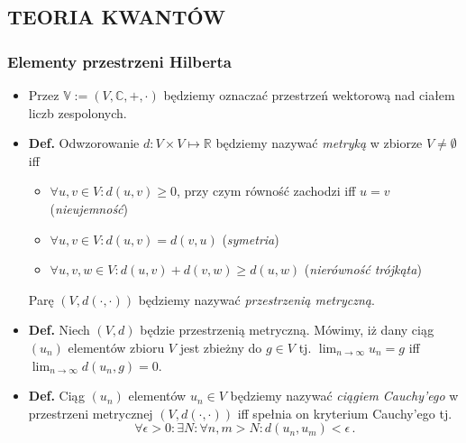 \documentclass{myclass}
\author{Bartosz Hanc}
\begin{document}
\subsection{TEORIA KWANTÓW}

\subsubsection{Elementy przestrzeni Hilberta}

\begin{itemize}

    \item Przez \(\mathbb{V} := (V,\mathbb{C},+,\cdot)\) będziemy oznaczać przestrzeń wektorową nad
    ciałem liczb zespolonych.

    \item \textbf{Def.} Odwzorowanie \(d: V \times V \mapsto \mathbb{R}\) będziemy nazywać
    \textit{metryką} w zbiorze \(V \neq \emptyset\) iff
    \begin{itemize}
    
        \item \(\forall u,v \in V : d(u,v) \geq 0\), przy czym równość zachodzi iff \(u = v\)
        (\textit{nieujemność})

        \item \(\forall u,v \in V : d(u,v) = d(v,u)\) (\textit{symetria})

        \item \(\forall u,v,w \in V : d(u,v) + d(v,w) \geq d(u,w)\) (\textit{nierówność trójkąta})

    \end{itemize}
    Parę \((V,d(\cdot,\cdot))\) będziemy nazywać \textit{przestrzenią metryczną}.

    \item \textbf{Def.} Niech \((V,d)\) będzie przestrzenią metryczną. Mówimy, iż dany ciąg
    \((u_n)\) elementów zbioru \(V\) jest zbieżny do \(g\in V\) tj. \(\lim_{n\to\infty}u_n = g\) iff
    \(\lim_{n\to\infty} d(u_n,g) = 0\).

    \item \textbf{Def.} Ciąg \((u_n)\) elementów \(u_n \in V\) będziemy nazywać \textit{ciągiem
    Cauchy'ego} w przestrzeni metrycznej \((V,d(\cdot,\cdot))\) iff spełnia on kryterium Cauchy'ego
    tj.
    \begin{equation*}
        \forall \epsilon > 0 : \exists N : \forall n,m > N : d(u_n,u_m) < \epsilon\,.
    \end{equation*}


\end{itemize}
\end{document}
